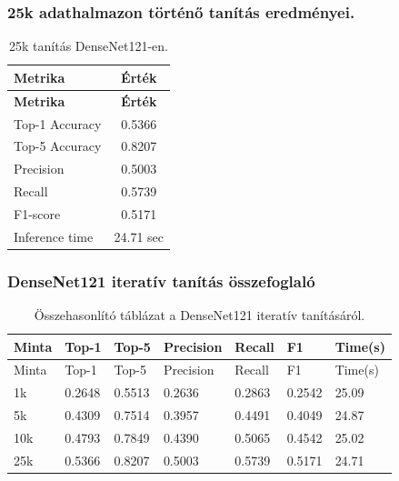     \subsubsection{25k adathalmazon történő tanítás eredményei.}
      \begin{center}
        \begin{longtable}{l c}
        \caption{25k tanítás DenseNet121-en.} \label{tab:phase03_DenseNet121_25k} \\
        \toprule
        \textbf{Metrika} & \textbf{Érték} \\
        \midrule
        \endfirsthead
        \toprule
        \textbf{Metrika} & \textbf{Érték} \\
        \midrule
        \endhead
        Top-1 Accuracy & 0.5366 \\
        Top-5 Accuracy & 0.8207 \\
        Precision      & 0.5003 \\
        Recall         & 0.5739 \\
        F1-score       & 0.5171 \\
        Inference time & 24.71 sec \\
        \bottomrule
        \end{longtable}
      \end{center}
    
    \subsubsection{DenseNet121 iteratív tanítás összefoglaló}
      \begin{center}
        \begin{longtable}{lllllll}
        \caption{Összehasonlító táblázat a DenseNet121 iteratív tanításáról.}\label{tab:phase3_DenseNet121_summary_table}\\
        \toprule
        Minta & Top-1 & Top-5 & Precision & Recall & F1 & Time(s) \\
        \midrule
        \endfirsthead
        \toprule
        Minta & Top-1 & Top-5 & Precision & Recall & F1 & Time(s) \\
        \midrule
        \endhead
        1k & 0.2648 & 0.5513 & 0.2636 & 0.2863 & 0.2542 & 25.09 \\
        5k & 0.4309 & 0.7514 & 0.3957 & 0.4491 & 0.4049 & 24.87 \\
        10k & 0.4793 & 0.7849 & 0.4390 & 0.5065 & 0.4542 & 25.02 \\
        25k & 0.5366 & 0.8207 & 0.5003 & 0.5739 & 0.5171 & 24.71 \\
        \bottomrule
        \end{longtable}
      \end{center}
      
